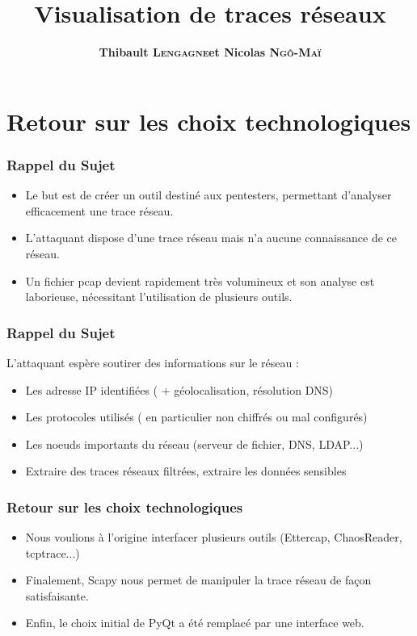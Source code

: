 \documentclass{beamer}
\title[Visualisation de traces réseaux]{Visualisation de traces réseaux}
\author{\textbf{Thibault \textsc{Lengagne}et Nicolas \textsc{Ngô-Maï}}}
\institute{Centrale Supélec - Campus de Rennes}
\begin{document}
  \begin{frame}
    \titlepage
  \end{frame}
  

 \section{Retour sur les choix technologiques}
  \begin{frame}
    \frametitle{Rappel du Sujet}
    \begin{itemize}
     \item Le but est de créer un outil destiné aux pentesters, permettant d'analyser efficacement une trace réseau.
     \item L'attaquant dispose d'une trace réseau mais n'a aucune connaissance de ce réseau.
     \item Un fichier pcap devient rapidement très volumineux et son analyse est laborieuse, nécessitant l'utilisation de plusieurs outils.
    \end{itemize}
  \end{frame}
  
  \begin{frame}
    \frametitle{Rappel du Sujet}
    L'attaquant espère soutirer des informations sur le réseau :
    \begin{itemize}
      \item Les adresse IP identifiées ( + géolocalisation, résolution DNS)
      \item Les protocoles utilisés ( en particulier non chiffrés ou mal configurés)
      \item Les noeuds importants du réseau (serveur de fichier, DNS, LDAP...)
      \item Extraire des traces réseaux filtrées, extraire les données sensibles
    \end{itemize}
  \end{frame}

  \begin{frame}
   \frametitle{Retour sur les choix technologiques}
    \begin{itemize}
      \item Nous voulions à l'origine interfacer plusieurs outils (Ettercap, ChaosReader, tcptrace...) 
      \item Finalement, Scapy nous permet de manipuler la trace réseau de façon satisfaisante.
      \item Enfin, le choix initial de PyQt a été remplacé par une interface web.
    \end{itemize}
  \end{frame}
  
\end{document}
